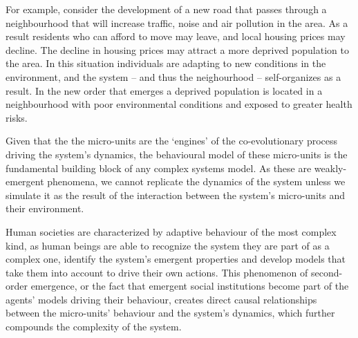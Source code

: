 \documentclass[review]{elsarticle}
\begin{document}
For example, consider the development of a new road that passes through a neighbourhood that will increase traffic, noise and air pollution in the area. As a result residents who can afford to move may leave, and local housing prices may decline. The decline in housing prices may attract a more deprived population to the area. In this situation individuals are adapting to new conditions in the environment, and the system -- and thus the neighourhood -- self-organizes as a result. In the new order that emerges a deprived population is located in a neighbourhood with poor environmental conditions and exposed to greater health risks.    

Given that the the micro-units are the `engines' of the co-evolutionary process driving the system's dynamics, the behavioural model of these micro-units is the fundamental building block of any complex systems model.  As these are weakly-emergent phenomena, we cannot replicate the dynamics of the system unless we simulate it as the result of the interaction between the system's micro-units and their environment.

Human societies are characterized by adaptive behaviour of the most complex kind, as human beings are able to recognize the system they are part of as a complex one, identify the system's emergent properties and develop models that take them into account to drive their own actions. This phenomenon of second-order emergence, or the fact that emergent social institutions become part of the agents' models driving their behaviour, creates direct causal relationships between the micro-units' behaviour and the system's dynamics, which further compounds the complexity of the system.


\end{document}
